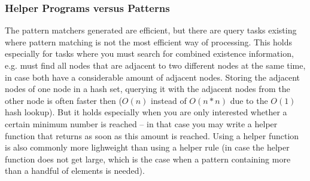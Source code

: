 \subsubsection*{Helper Programs versus Patterns}
The pattern matchers generated are efficient, but there are query tasks existing where pattern matching is not the most efficient way of processing. 
This holds especially for tasks where you must search for combined existence information, e.g. must find all nodes that are adjacent to two different nodes at the same time, in case both have a considerable amount of adjacent nodes. 
Storing the adjacent nodes of one node in a hash set, querying it with the adjacent nodes from the other node is often faster then ($O(n)$ instead of $O(n*n)$ due to the $O(1)$ hash lookup).
But it holds especially when you are only interested whether a certain minimum number is reached -- in that case you may write a helper function that returns as soon as this amount is reached.
Using a helper function is also commonly more lighweight than using a helper rule (in case the helper function does not get large, which is the case when a pattern containing more than a handful of elements is needed).

